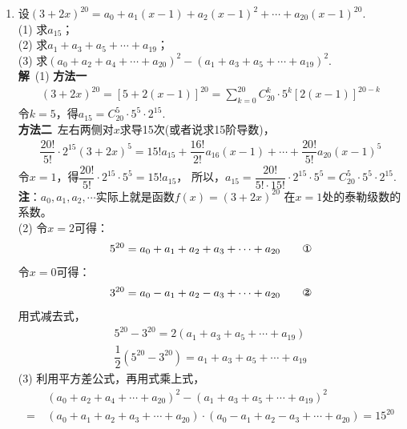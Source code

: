 \begin{enumerate}[label={【\textbf{例\thechapter.\arabic*}】},
 leftmargin=\inteval{\myenumleftmargin}pt,
 itemsep=\inteval{\myenumitempsep}pt,
 itemindent=\inteval{\myenumitemindent}pt]
\item 设$ (3+2x)^{20}=a_0+a_1(x-1)+a_2(x-1)^2+\cdots+a_{20}(x-1)^{20} $. \\
(1) 求$ a_{15} $；\\
(2) 求$ a_{1}+a_{3}+a_{5}+\cdots+a_{19} $；\\
(3) 求$ (a_{0}+a_{2}+a_{4}+\cdots+a_{20})^2-
(a_{1}+a_{3}+a_{5}+\cdots+a_{19})^2 $. \\
\textbf{解}\ (1) \textbf{方法一}
\begin{align*}
    (3+2x)^{20}=[5+2(x-1)]^{20}=
    \sum_{k=0}^{20}C_{20}^{k}\cdot 5^k[2(x-1)]^{20-k}
\end{align*}
令$ k=5 $，得$ a_{15}=C_{20}^5 \cdot 5^5\cdot 2^{15} $. \\
\textbf{方法二}\ 左右两侧对$ x $求导15次(或者说求15阶导数)，
\begin{align*}
    \dfrac{20!}{5!} \cdot 2^{15}(3+2x)^5= 15!a_{15}+
    \dfrac{16!}{2!}a_{16}(x-1)+\cdots+\dfrac{20!}{5!}a_{20}(x-1)^5
\end{align*}
令$ x=1 $，得$ \dfrac{20!}{5!} \cdot 2^{15}\cdot 5^5=15!a_{15} $，
所以，$ a_{15}=\dfrac{20!}{5!\cdot 15!}\cdot 2^{15}\cdot 5^5=
C_{20}^5 \cdot 5^5\cdot 2^{15} $. \\
\textbf{注}：$ a_0,a_1,a_2,\cdots $实际上就是函数$ f(x)=(3+2x)^{20} $
在$ x=1 $处的泰勒级数的系数。\\
(2) 令$ x=2 $可得：
\begin{gather*} 
    5^{20}=a_0+a_1+a_2+a_3+\cdots+a_{20}  \tag*{\ding{172}}
\end{gather*}
令$ x=0 $可得：
\begin{gather*}
    3^{20}=a_0-a_1+a_2-a_3+\cdots+a_{20}  \tag*{\ding{173}}
\end{gather*}
用式减去式，
\begin{gather*}
    5^{20}-3^{20}=2(a_{1}+a_{3}+a_{5}+\cdots+a_{19}) \\
    \dfrac{1}{2}(5^{20}-3^{20})=a_{1}+a_{3}+a_{5}+\cdots+a_{19}
\end{gather*}
(3) 利用平方差公式，再用式乘上式，
\begin{align*}
    &\ (a_{0}+a_{2}+a_{4}+\cdots+a_{20})^2-
    (a_{1}+a_{3}+a_{5}+\cdots+a_{19})^2 \\
    =&\ (a_0+a_1+a_2+a_3+\cdots+a_{20})\cdot 
    (a_0-a_1+a_2-a_3+\cdots+a_{20}) =15^{20}
\end{align*}


\end{enumerate}
